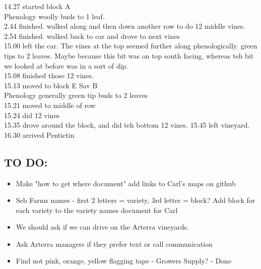 \documentclass[11pt,letter]{article}
\newenvironment{smitemize}{
\begin{itemize}
  \setlength{\itemsep}{0pt}
  \setlength{\parskip}{0.8pt}
  \setlength{\parsep}{0pt}}
{\end{itemize}
}
\begin{document}
\begin{smitemize}
14.27 started block A \\
Phenology woolly buds to 1 leaf. \\
2.44 finished. walked along and then down another row to do 12 middle vines. \\
2.54 finished. walked back to car and drove to next vines\\
15.00 left the car. 
The vines at the top seemed further along phenologically. green tips to 2 leaves. Maybe because this bit was on top south facing, whereas teh bit we looked at before was in a sort of dip. \\
15.08 finished those 12 vines.\\ 
15.13 moved to block E Sav B\\
Phenology generally green tip buds to 2 leaves \\
15.21 moved to middle of row\\
15.24 did 12 vines \\
15.35 drove around the block, and did teh bottom 12 vines.
15.45 left vineyard.
16.30 arrived Pentictin

\end{smitemize}


\subsection{TO DO:}
\begin{smitemize}
\item Make "how to get where document" add links to Carl's maps on github
\item Seb Farms names - first 2 letters = variety, 3rd letter = block? Add block for each variety to the variety names document for Carl
\item We should ask if we can drive on the Arterra vineyards.
\item Ask Arterra managers if they prefer text or call communication
\item Find not pink, orange, yellow flagging tape - Growers Supply? - Done 

\end{smitemize}
\end{document}
